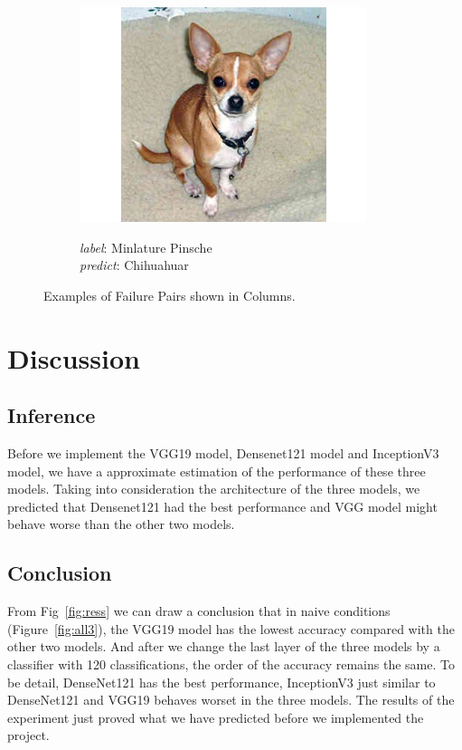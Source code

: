\documentclass{article}
\begin{document}
\begin{figure}
\begin{subfigure}{0.32\linewidth}
		\includegraphics[width=\linewidth]{pics/s2}
		\caption{}
		\emph{label}:  Minlature Pinsche \\  \emph{predict}: Chihuahuar
		\label{fig:s2}
	\end{subfigure} 
	
	\caption{Examples of Failure Pairs shown in Columns.}
\end{figure}


\newpage
\section{Discussion}

\subsection{Inference}
Before we implement the VGG19 model, Densenet121 model and InceptionV3 model, we have a approximate estimation of the performance of these three models. Taking into consideration the architecture of the three models, we predicted that Densenet121 had the best performance and VGG model might behave worse than the other two models. 
\subsection{Conclusion}
From Fig~\ref{fig:ress} we can draw a conclusion that in naive conditions (Figure~\ref{fig:all3}), the VGG19 model has the lowest accuracy compared with the other two models. And after we change the last layer of the three models by a classifier with 120 classifications, the order of the accuracy remains the same. To be detail, DenseNet121 has the best performance, InceptionV3 just similar to DenseNet121 and VGG19 behaves worset in the three models. The results of the experiment just proved what we have predicted before we implemented the project.
\end{document}
